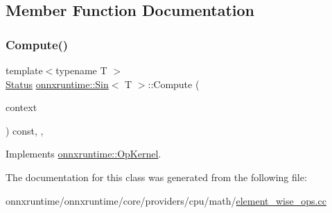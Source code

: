 \subsection{Member Function Documentation}
\mbox{\label{classonnxruntime_1_1Sin_a0627e01dab1e7af1e2b5ed19a35b09d1}} 
\subsubsection{\texorpdfstring{Compute()}{Compute()}}
{\footnotesize\ttfamily template$<$typename T $>$ \\
\mbox{\hyperlink{classonnxruntime_1_1common_1_1Status}{Status}} \mbox{\hyperlink{classonnxruntime_1_1Sin}{onnxruntime\+::\+Sin}}$<$ T $>$\+::Compute (\begin{DoxyParamCaption}\item[{\mbox{\hyperlink{classonnxruntime_1_1OpKernelContext}{Op\+Kernel\+Context}} $\ast$}]{context }\end{DoxyParamCaption}) const\hspace{0.3cm}{\ttfamily [inline]}, {\ttfamily [override]}, {\ttfamily [virtual]}}



Implements \mbox{\hyperlink{classonnxruntime_1_1OpKernel_a9eca8656a78b1b3ab9d3351a12798650}{onnxruntime\+::\+Op\+Kernel}}.



The documentation for this class was generated from the following file\+:\begin{DoxyCompactItemize}
\item 
onnxruntime/onnxruntime/core/providers/cpu/math/\mbox{\hyperlink{element__wise__ops_8cc}{element\+\_\+wise\+\_\+ops.\+cc}}\end{DoxyCompactItemize}
